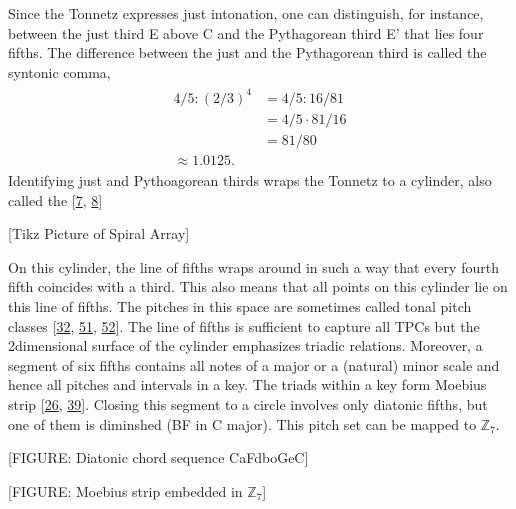 \documentclass[letterpaper,10pt,english]{sphinxmanual}
\begin{document}
\sphinxAtStartPar
Since the Tonnetz expresses just intonation, one can distinguish, for
instance, between the just third E above C and the Pythagorean third E’
that lies four fifths. The difference between the just and the
Pythagorean third is called the syntonic comma,
\begin{equation*}
\begin{split}\begin{aligned}
    4/5 : (2/3)^4 &= 4/5 : 16/81\\
                                &= 4/5 \cdot 81/16\\
                                &= 81/80 \\
                                \approx 1.0125.\end{aligned}\end{split}
\end{equation*}
\sphinxAtStartPar
Identifying just and Pythoagorean thirds wraps the Tonnetz to a
cylinder, also called the 
{[}\hyperlink{cite.8_bibliography:id31}{7}, \hyperlink{cite.8_bibliography:id33}{8}{]}

\sphinxAtStartPar
{[}Tikz Picture of Spiral Array{]}

\sphinxAtStartPar
On this cylinder, the line of fifths wraps around in such a way that
every fourth fifth coincides with a third. This also means that all
points on this cylinder lie on this line of fifths. The pitches in this
space are sometimes called tonal pitch classes
{[}\hyperlink{cite.8_bibliography:id34}{32}, \hyperlink{cite.8_bibliography:id30}{51}, \hyperlink{cite.8_bibliography:id25}{52}{]}.
The line of
fifths is sufficient to capture all TPCs but the 2\sphinxhyphen{}dimensional surface
of the cylinder emphasizes triadic relations. Moreover, a segment of six
fifths contains all notes of a major or a (natural) minor scale and
hence all pitches and intervals in a key. The triads within a key form
Moebius strip {[}\hyperlink{cite.8_bibliography:id35}{26}, \hyperlink{cite.8_bibliography:id32}{39}{]}.
Closing this segment to a circle involves only diatonic fifths, but one of them is
diminshed (B\textendash{}F in C major). This pitch set can be mapped to
\(\mathbb Z_7\).

\sphinxAtStartPar
{[}FIGURE: Diatonic chord sequence C\sphinxhyphen{}a\sphinxhyphen{}F\sphinxhyphen{}d\sphinxhyphen{}bo\sphinxhyphen{}G\sphinxhyphen{}e\sphinxhyphen{}C{]}

\sphinxAtStartPar
{[}FIGURE: Moebius strip embedded in \(\mathbb Z_7\){]}
\end{document}

